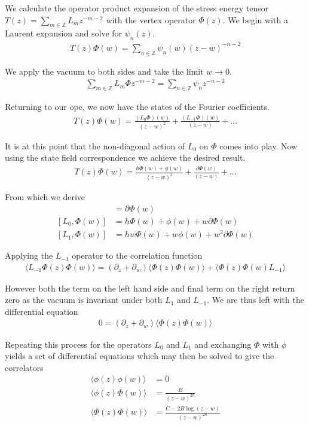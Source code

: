 \documentclass[a4paper,reqno,12pt]{report}
\theoremstyle{definition}
\newcommand{\Z}{\mathbb{Z}}
\newcommand{\bra}{\langle}
\newcommand{\ket}{\rangle}
\numberwithin{equation}{section}
\theoremstyle{plain}
\begin{document}
We calculate the operator product expansion of the stress energy tensor $T(z) = \sum_{m\in \Z} L_m z^{-m-2}$ with the vertex operator $\Phi(z)$. We begin with a Laurent expansion and solve for $\psi_n (z)$.
\begin{align*}
T(z)\Phi(w) = \sum_{n\in \Z}\psi_n (w) (z-w)^{-n-2}
\end{align*}

We apply the vacuum to both sides and take the limit $w \rightarrow 0$.
\begin{align*}
 \sum_{m\in \Z} L_m \Phi z^{-m-2} = \sum_{n\in \Z}\psi_n z^{-n-2}
\end{align*}

Returning to our ope, we now have the states of the Fourier coefficients.
\begin{align*}
T(z)\Phi(w) = \frac{(L_0 \Phi)(w)}{(z-w)^2} + \frac{(L_{-1} \Phi)(w)}{(z-w)} + \dots 
\end{align*}

It is at this point that the non-diagonal action of $L_0$ on $\Phi$ comes into play. Now using the state field correspondence we achieve the desired result.
\begin{align*}
T(z)\Phi(w) = \frac{h \Phi(w) + \phi(w)}{(z-w)^2} + \frac{\partial \Phi(w)}{(z-w)} + \dots 
\end{align*}

From which  we derive
\begin{align*}
[L_{-1}, \Phi(w)] &= \partial \Phi(w) \\
[L_0, \Phi(w)] &= h\Phi(w) + \phi(w)  + w\partial \Phi(w)\\
[L_1, \Phi(w)] &= hw\Phi(w) + w\phi(w)  + w^2\partial \Phi(w) 
\end{align*}

Applying the $L_{-1}$ operator to the correlation function
\begin{align*}
\bra L_{-1}\Phi(z)\Phi(w) \ket = (\partial_z + \partial_w)\bra \Phi(z)\Phi(w) \ket +  \bra \Phi(z)\Phi(w)L_{-1} \ket
\end{align*}

However both the term on the left hand side and final term on the right return zero as the vacuum is invariant under both $L_1$ and $L_{-1}$. We are thus left with the differential equation 
\begin{align*}
0 =  (\partial_z + \partial_w)\bra \Phi(z)\Phi(w) \ket 
\end{align*}

Repeating this process for the operators $L_0$ and $L_1$ and exchanging $\Phi$ with $\phi$ yields a set of differential equations which may then be solved to give the correlators
\begin{align*}
\bra \phi(z)\phi(w) \ket  &= 0\\
\bra \phi(z)\Phi(w) \ket  &= \frac{B}{(z-w)^{2h}}\\
\bra \Phi(z)\Phi(w) \ket &= \frac{C - 2B\log(z-w)}{(z-w)^{2h}}
\end{align*}
\end{document}
